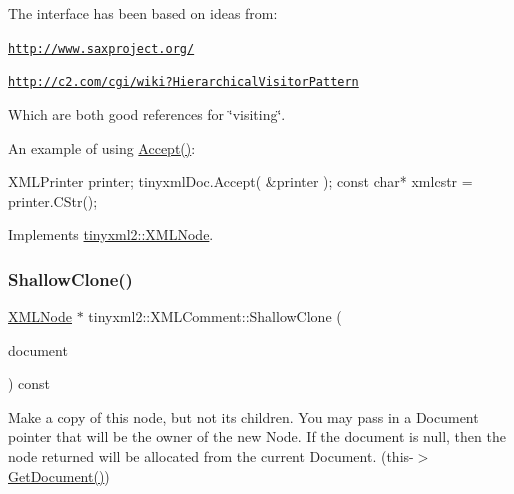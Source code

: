 The interface has been based on ideas from\+:


\begin{DoxyItemize}
\item \href{http://www.saxproject.org/}{\tt http\+://www.\+saxproject.\+org/}
\item \href{http://c2.com/cgi/wiki?HierarchicalVisitorPattern}{\tt http\+://c2.\+com/cgi/wiki?\+Hierarchical\+Visitor\+Pattern}
\end{DoxyItemize}

Which are both good references for \char`\"{}visiting\char`\"{}.

An example of using \hyperlink{classtinyxml2_1_1_x_m_l_comment_a27b37d16cea01b5329dfbbb4f9508e39}{Accept()}\+: \begin{DoxyVerb}XMLPrinter printer;
tinyxmlDoc.Accept( &printer );
const char* xmlcstr = printer.CStr();
\end{DoxyVerb}
 

Implements \hyperlink{classtinyxml2_1_1_x_m_l_node_a81e66df0a44c67a7af17f3b77a152785}{tinyxml2\+::\+X\+M\+L\+Node}.

\mbox{\label{classtinyxml2_1_1_x_m_l_comment_adf5b5c0319351dcc339df098d11e8fb2}} 
\subsubsection{\texorpdfstring{Shallow\+Clone()}{ShallowClone()}}
{\footnotesize\ttfamily \hyperlink{classtinyxml2_1_1_x_m_l_node}{X\+M\+L\+Node} $\ast$ tinyxml2\+::\+X\+M\+L\+Comment\+::\+Shallow\+Clone (\begin{DoxyParamCaption}\item[{\hyperlink{classtinyxml2_1_1_x_m_l_document}{X\+M\+L\+Document} $\ast$}]{document }\end{DoxyParamCaption}) const\hspace{0.3cm}{\ttfamily [virtual]}}

Make a copy of this node, but not its children. You may pass in a Document pointer that will be the owner of the new Node. If the \textquotesingle{}document\textquotesingle{} is null, then the node returned will be allocated from the current Document. (this-\/$>$\hyperlink{classtinyxml2_1_1_x_m_l_node_af343d1ef0b45c0020e62d784d7e67a68}{Get\+Document()})

